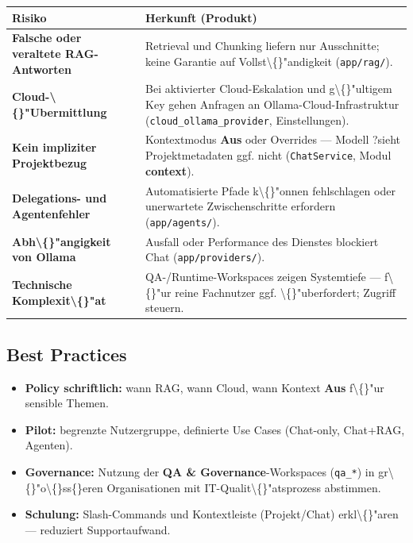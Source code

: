 \begin{center}
\begin{tabular}{ll}
\hline
Risiko & Herkunft (Produkt) \\
\hline
\textbf{Falsche oder veraltete RAG-Antworten} & Retrieval und Chunking liefern nur Ausschnitte; keine Garantie auf Vollst\textbackslash\{\}"andigkeit (\texttt{app/rag/}). \\
\textbf{Cloud-\textbackslash\{\}"Ubermittlung} & Bei aktivierter Cloud-Eskalation und g\textbackslash\{\}"ultigem Key gehen Anfragen an Ollama-Cloud-Infrastruktur (\texttt{cloud\_ollama\_provider}, Einstellungen). \\
\textbf{Kein impliziter Projektbezug} & Kontextmodus \textbf{Aus} oder Overrides --- Modell ?sieht\texttt{} Projektmetadaten ggf. nicht (\texttt{ChatService}, Modul \textbf{context}). \\
\textbf{Delegations- und Agentenfehler} & Automatisierte Pfade k\textbackslash\{\}"onnen fehlschlagen oder unerwartete Zwischenschritte erfordern (\texttt{app/agents/}). \\
\textbf{Abh\textbackslash\{\}"angigkeit von Ollama} & Ausfall oder Performance des Dienstes blockiert Chat (\texttt{app/providers/}). \\
\textbf{Technische Komplexit\textbackslash\{\}"at} & QA-/Runtime-Workspaces zeigen Systemtiefe --- f\textbackslash\{\}"ur reine Fachnutzer ggf. \textbackslash\{\}"uberfordert; Zugriff steuern. \\
\hline
\end{tabular}
\end{center}

\subsection{Best Practices}

\begin{itemize}
\item \textbf{Policy schriftlich:} wann RAG, wann Cloud, wann Kontext \textbf{Aus} f\textbackslash\{\}"ur sensible Themen.
\item \textbf{Pilot:} begrenzte Nutzergruppe, definierte Use Cases (Chat-only, Chat+RAG, Agenten).
\item \textbf{Governance:} Nutzung der \textbf{QA \& Governance}-Workspaces (\texttt{qa\_*}) in gr\textbackslash\{\}"o\textbackslash\{\}ss\{\}eren Organisationen mit IT-Qualit\textbackslash\{\}"atsprozess abstimmen.
\item \textbf{Schulung:} Slash-Commands und Kontextleiste (Projekt/Chat) erkl\textbackslash\{\}"aren --- reduziert Supportaufwand.
\end{itemize}
